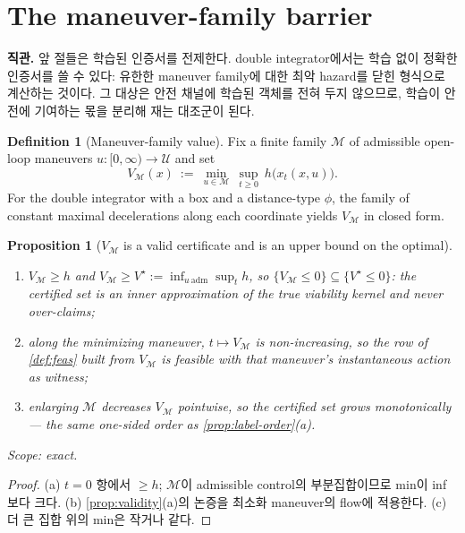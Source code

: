\documentclass[11pt]{article}
\theoremstyle{plain}
\newtheorem{proposition}[theorem]{Proposition}
\theoremstyle{definition}
\newtheorem{definition}[theorem]{Definition}
\theoremstyle{remark}
\newcommand{\calU}{\mathcal{U}}
\newcommand{\eqdef}{:=}
\begin{document}
\section{The maneuver-family barrier}\label{sec:di-vm}

\textbf{직관.} 앞 절들은 학습된 인증서를 전제한다. double integrator에서는 학습 없이 정확한
인증서를 쓸 수 있다: 유한한 maneuver family에 대한 최악 hazard를 닫힌 형식으로 계산하는 것이다.
그 대상은 안전 채널에 학습된 객체를 전혀 두지 않으므로, 학습이 안전에 기여하는 몫을 분리해 재는
대조군이 된다.

\begin{definition}[Maneuver-family value]\label{def:vm}
Fix a finite family $\mathcal M$ of admissible open-loop maneuvers $u:[0,\infty)\to\calU$ and set
\begin{equation}
V_{\mathcal M}(x)\ \eqdef\ \min_{u\in\mathcal M}\ \sup_{t\ge0}\ h\big(x_t(x,u)\big).
\end{equation}
For the double integrator with a box and a distance-type $\phi$, the family of constant maximal
decelerations along each coordinate yields $V_{\mathcal M}$ in closed form.
\end{definition}

\begin{proposition}[$V_{\mathcal M}$ is a valid certificate and is an upper bound on the optimal]\label{prop:vm}
\begin{enumerate}[label=(\alph*)]
  \item $V_{\mathcal M}\ge h$ and $V_{\mathcal M}\ge V^\star\eqdef\inf_{u\ \mathrm{adm}}\sup_t h$,
  so $\{V_{\mathcal M}\le0\}\subseteq\{V^\star\le0\}$: the certified set is an inner
  approximation of the true viability kernel and never over-claims;
  \item along the minimizing maneuver, $t\mapsto V_{\mathcal M}$ is non-increasing, so the row of
  \cref{def:feas} built from $V_{\mathcal M}$ is feasible with that maneuver's instantaneous
  action as witness;
  \item enlarging $\mathcal M$ decreases $V_{\mathcal M}$ pointwise, so the certified set grows
  monotonically --- the same one-sided order as \cref{prop:label-order}(a).
\end{enumerate}
Scope: exact.
\end{proposition}
\begin{proof}
(a) $t=0$ 항에서 $\ge h$; $\mathcal M$이 admissible control의 부분집합이므로 min이 inf보다 크다.
(b) \cref{prop:validity}(a)의 논증을 최소화 maneuver의 flow에 적용한다. (c) 더 큰 집합 위의
min은 작거나 같다.
\end{proof}
\end{document}
